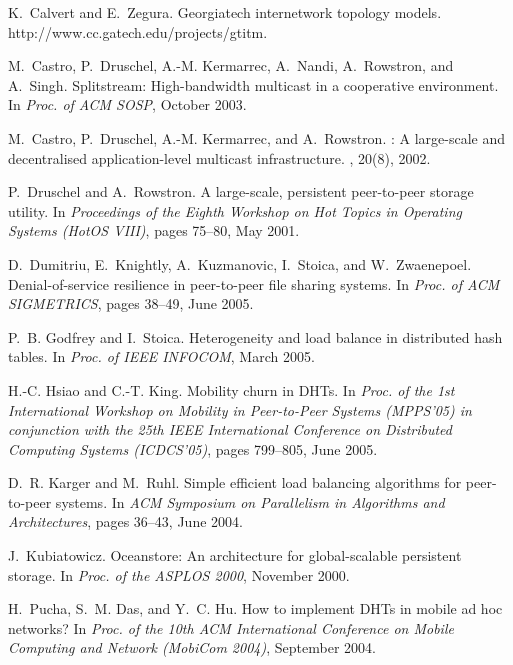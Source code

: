 \documentclass{sig-alt-release2}
\begin{document}

\begin{thebibliography}{10}

K.~Calvert and E.~Zegura.
\newblock Georgiatech internetwork topology models.
\newblock http://www.cc.gatech.edu/projects/gtitm.

M.~Castro, P.~Druschel, A.-M. Kermarrec, A.~Nandi, A.~Rowstron, and
A.~Singh.
\newblock Splitstream: High-bandwidth multicast in a cooperative environment.
\newblock In {\em Proc. of ACM SOSP}, October 2003.

M.~Castro, P.~Druschel, A.-M. Kermarrec, and A.~Rowstron.
: A large-scale and decentralised application-level multicast
  infrastructure.
, 20(8), 2002.

P.~Druschel and A.~Rowstron.
\newblock A large-scale, persistent peer-to-peer storage utility.
\newblock In {\em Proceedings of the Eighth Workshop on Hot Topics in Operating
  Systems (HotOS VIII)}, pages 75--80, May 2001.

D.~Dumitriu, E.~Knightly, A.~Kuzmanovic, I.~Stoica, and
W.~Zwaenepoel.
\newblock Denial-of-service resilience in peer-to-peer file sharing systems.
\newblock In {\em Proc. of ACM SIGMETRICS}, pages 38--49, June 2005.

P.~B. Godfrey and I.~Stoica.
\newblock Heterogeneity and load balance in distributed hash tables.
\newblock In {\em Proc. of IEEE INFOCOM}, March 2005.

H.-C. Hsiao and C.-T. King.
\newblock Mobility churn in {DHT}s.
\newblock In {\em Proc. of the 1st International Workshop on Mobility in
  Peer-to-Peer Systems (MPPS'05) in conjunction with the 25th IEEE
  International Conference on Distributed Computing Systems (ICDCS'05)}, pages
  799--805, June 2005.

D.~R. Karger and M.~Ruhl.
\newblock Simple efficient load balancing algorithms for peer-to-peer systems.
\newblock In {\em ACM Symposium on Parallelism in Algorithms and
  Architectures}, pages 36--43, June 2004.

J.~Kubiatowicz.
\newblock Oceanstore: An architecture for global-scalable persistent storage.
\newblock In {\em Proc. of the ASPLOS 2000}, November 2000.

H.~Pucha, S.~M. Das, and Y.~C. Hu.
\newblock How to implement {DHT}s in mobile ad hoc networks?
\newblock In {\em Proc. of the 10th ACM International Conference on Mobile
  Computing and Network (MobiCom 2004)}, September 2004.


\end{thebibliography}
\end{document}
